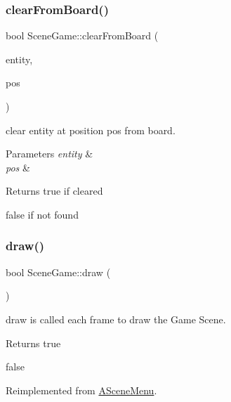 \subsubsection{\texorpdfstring{clear\+From\+Board()}{clearFromBoard()}}
{\footnotesize\ttfamily bool Scene\+Game\+::clear\+From\+Board (\begin{DoxyParamCaption}\item[{\hyperlink{class_a_entity}{A\+Entity} $\ast$}]{entity,  }\item[{glm\+::vec2}]{pos }\end{DoxyParamCaption})}



clear entity at position pos from board. 


\begin{DoxyParams}{Parameters}
{\em entity} & \\
\hline
{\em pos} & \\
\hline
\end{DoxyParams}
\begin{DoxyReturn}{Returns}
true if cleared 

false if not found 
\end{DoxyReturn}
\mbox{\label{class_scene_game_a0797fee2de442f68aef19cc5c3299ec3}} 
\subsubsection{\texorpdfstring{draw()}{draw()}}
{\footnotesize\ttfamily bool Scene\+Game\+::draw (\begin{DoxyParamCaption}{ }\end{DoxyParamCaption})\hspace{0.3cm}{\ttfamily [virtual]}}



draw is called each frame to draw the Game Scene. 

\begin{DoxyReturn}{Returns}
true 

false 
\end{DoxyReturn}


Reimplemented from \hyperlink{class_a_scene_menu_a5c11f34c83f025e1181219bf25ce4694}{A\+Scene\+Menu}.

\mbox{\label{class_scene_game_a128672ac2376a82f99b4a22fb759c368}} 
